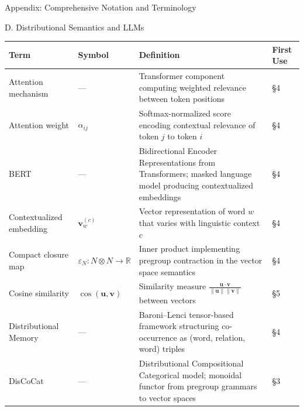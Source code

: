 \documentclass[
  ignorenonframetext,
]{beamer}
\newcounter{none} %
\begin{document}
\begin{frame}{Appendix: Comprehensive Notation and Terminology}
\begin{block}{D. Distributional Semantics and LLMs}
\protect{}\label{d.-distributional-semantics-and-llms}
{\def\LTcaptype{none} %
\begin{longtable}[]{@{}
  >{\raggedright\arraybackslash}p{}
  >{\centering\arraybackslash}p{}
  >{\raggedright\arraybackslash}p{}
  >{\centering\arraybackslash}p{}@{}}
\toprule\noalign{}
\begin{minipage}[b]{\linewidth}\raggedright
Term
\end{minipage} & \begin{minipage}[b]{\linewidth}\centering
Symbol
\end{minipage} & \begin{minipage}[b]{\linewidth}\raggedright
Definition
\end{minipage} & \begin{minipage}[b]{\linewidth}\centering
First Use
\end{minipage} \\
\midrule\noalign{}
\endhead
Attention mechanism & --- & Transformer component computing weighted
relevance between token positions & §4 \\
Attention weight & \(\alpha_{ij}\) & Softmax-normalized score encoding
contextual relevance of token \(j\) to token \(i\) & §4 \\
BERT & --- & Bidirectional Encoder Representations from Transformers;
masked language model producing contextualized embeddings & §4 \\
Contextualized embedding & \(\mathbf{v}_w^{(c)}\) & Vector
representation of word \(w\) that varies with linguistic context \(c\) &
§4 \\
Compact closure map & \(\varepsilon_N: N \otimes N \to \mathbb{R}\) &
Inner product implementing pregroup contraction in the vector space
semantics & §4 \\
Cosine similarity & \(\cos(\mathbf{u}, \mathbf{v})\) & Similarity
measure
\(\frac{\mathbf{u} \cdot \mathbf{v}}{\|\mathbf{u}\| \|\mathbf{v}\|}\)
between vectors & §5 \\
Distributional Memory & --- & Baroni--Lenci tensor-based framework
structuring co-occurrence as (word, relation, word) triples & §4 \\
DisCoCat & --- & Distributional Compositional Categorical model;
monoidal functor from pregroup grammars to vector spaces & §3 \\

\end{longtable}}
\end{block}
\end{frame}
\end{document}
